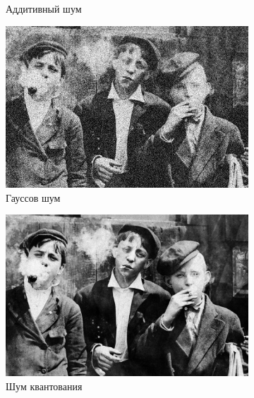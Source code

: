 \begin{figure}[ht!]
\begin{subfigure}[b]{0.5\linewidth}
    \caption{Аддитивный шум} 
    \vspace{4ex}
  \end{subfigure}%
  \begin{subfigure}[b]{0.5\linewidth}
    \centering
    \includegraphics[width=0.95\linewidth]{../Adaptive_Median_Filter/Adaptive_Median_Gaussian_noise_k=7.jpg} 
    \caption{Гауссов шум} 
    \vspace{4ex}
  \end{subfigure}
  \begin{subfigure}[b]{0.5\linewidth}
    \centering
    \includegraphics[width=0.95\linewidth]{../Adaptive_Median_Filter/Adaptive_Median_Poisson_noise_k=7.jpg} 
    \caption{Шум квантования} 
  \end{subfigure}%
  \begin{subfigure}[b]{0.5\linewidth}
      \centering

\end{subfigure}
\end{figure}
